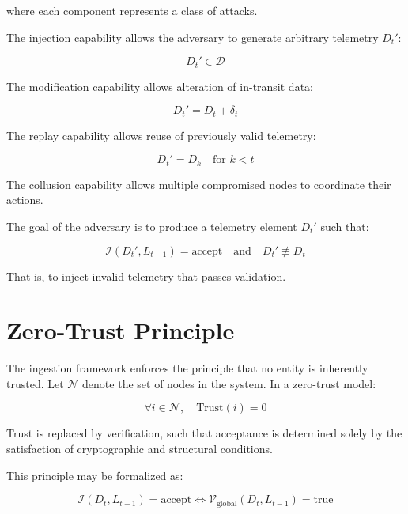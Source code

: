 where each component represents a class of attacks.

The injection capability allows the adversary to generate arbitrary telemetry $D_t'$:

\begin{equation}
D_t' \in \mathcal{D}
\end{equation}

The modification capability allows alteration of in-transit data:

\begin{equation}
D_t' = D_t + \delta_t
\end{equation}

The replay capability allows reuse of previously valid telemetry:

\begin{equation}
D_t' = D_k \quad \text{for } k < t
\end{equation}

The collusion capability allows multiple compromised nodes to coordinate their actions.

The goal of the adversary is to produce a telemetry element $D_t'$ such that:

\begin{equation}
\mathcal{I}(D_t', L_{t-1}) = \text{accept} \quad \text{and} \quad D_t' \not\equiv D_t
\end{equation}

That is, to inject invalid telemetry that passes validation.

\section{Zero-Trust Principle}

The ingestion framework enforces the principle that no entity is inherently trusted. Let $\mathcal{N}$ denote the set of nodes in the system. In a zero-trust model:

\begin{equation}
\forall i \in \mathcal{N}, \quad \text{Trust}(i) = 0
\end{equation}

Trust is replaced by verification, such that acceptance is determined solely by the satisfaction of cryptographic and structural conditions.

This principle may be formalized as:

\begin{equation}
\mathcal{I}(D_t, L_{t-1}) = \text{accept} \iff \mathcal{V}_{\text{global}}(D_t, L_{t-1}) = \text{true}
\end{equation}

